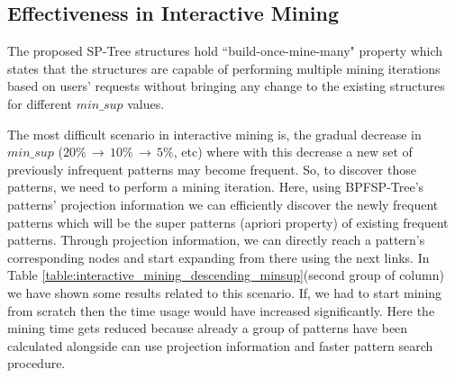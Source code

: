 \subsection{Effectiveness in Interactive Mining}
The proposed SP-Tree structures hold ``build-once-mine-many" property which states that the structures are capable of performing multiple mining iterations based on users' requests without bringing any change to the existing structures for different $min\_sup$ values.

The most difficult scenario in interactive mining is, the gradual decrease in $min\_sup$  ($20\% \,\to\, 10\% \,\to\, 5\%$, etc) where with this decrease a new set of previously infrequent patterns may become frequent. So, to discover those patterns, we need to perform a mining iteration. Here, using BPFSP-Tree's patterns' projection information we can efficiently discover the newly frequent patterns which will be the super patterns (apriori property) of existing frequent patterns. Through projection information, we can directly reach a pattern's corresponding nodes and start expanding from there using the next links. In Table \ref{table:interactive_mining_descending_minsup}(second group of column) we have shown some results related to this scenario. If, we had to start mining from scratch then the time usage would have increased significantly. Here the mining time gets reduced because already a group of patterns have been calculated alongside can use projection information and faster pattern search procedure. 

